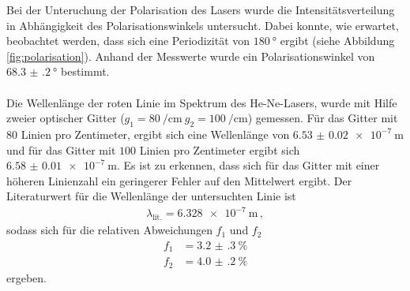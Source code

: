 Bei der Unteruchung der Polarisation des Lasers wurde die Intensitätsverteilung
in Abhängigkeit des Polarisationswinkels untersucht. Dabei konnte, wie erwartet,
beobachtet werden, dass sich eine Periodizität von $\SI{180}{\degree}$
ergibt (siehe Abbildung \ref{fig:polarisation}). Anhand der Messwerte
wurde ein Polarisationswinkel von $\SI{68.3(2)}{\degree}$ bestimmt.\\ \\


Die Wellenlänge der roten Linie im Spektrum des He-Ne-Lasers, wurde mit Hilfe
zweier optischer Gitter ($g_{1} = \SI{80}{\per\centi\meter} \ g_{2} = \SI{100}{\per\centi\meter}$)
gemessen. Für das Gitter mit $80$ Linien pro Zentimeter, ergibt sich eine Wellenlänge
von $\SI{6.53(2) e-7}{\meter}$ und für das Gitter mit $100$ Linien pro Zentimeter
ergibt sich $\SI{6.58(1) e-7}{\meter}$. Es ist zu erkennen, dass sich für das Gitter mit
einer höheren Linienzahl ein geringerer Fehler auf den Mittelwert ergibt.
Der Literaturwert\cite{sample} für die Wellenlänge der untersuchten Linie ist
\begin{align*}
  \lambda_{\text{lit.}} = \SI{6.328 e-7}{\meter} \, ,
\end{align*}
sodass sich für die relativen Abweichungen $f_{1}$ und $f_{2}$
\begin{align*}
  f_{1} &= \SI{3.2(3)}{\percent}\\
  f_{2} &= \SI{4.0(2)}{\percent}
\end{align*}
ergeben.
